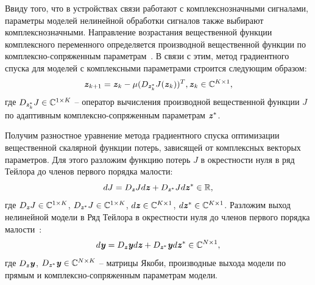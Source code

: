Ввиду того, что в устройствах связи работают с комплекснозначными сигналами, параметры моделей нелинейной обработки сигналов также выбирают комплекснозначными. Направление возрастания вещественной функции комплексного переменного определяется производной вещественной функции по комплексно-сопряженным параметрам~\cite{wirt_deriv_book}. В связи с этим, метод градиентного спуска для моделей с комплексными параметрами строится следующим образом:
\begin{equation}
	\textbf{\textit{z}}_{k+1}=\textbf{\textit{z}}_{k}-\mu (D_{\textbf{\textit{z}}_k^*}J(\textbf{\textit{z}}_{k}))^T, \textbf{\textit{z}}_k\in\mathbb{C}^{K\times1},
	\label{grad_descent_сomplex}
\end{equation}
где $D_{\textbf{\textit{z}}_k^*}J\in\mathbb{C}^{1\times K}$ -- оператор вычисления производной вещественной функции $J$ по адаптивным комплексно-сопряженным параметрам $\textbf{\textit{z}}^*$.

Получим разностное уравнение метода градиентного спуска оптимизации вещественной скалярной функции потерь, зависящей от комплексных векторых параметров. Для этого разложим функцию потерь $J$ в окрестности нуля в ряд Тейлора до членов первого порядка малости:
\begin{equation}
	dJ=D_{\textbf{\textit{z}}}Jd\textbf{\textit{z}}+D_{\textbf{\textit{z}}^*}Jd\textbf{\textit{z}}^*\in\mathbb{R},
	\label{first_diff}
\end{equation}
где $D_{\textbf{\textit{z}}}J\in\mathbb{C}^{1\times K}$, $D_{\textbf{\textit{z}}^*}J\in\mathbb{C}^{1\times K}$, $d\textbf{\textit{z}}\in\mathbb{C}^{K\times 1}$, $d\textbf{\textit{z}}^*\in\mathbb{C}^{K\times 1}$.
Разложим выход нелинейной модели в Ряд Тейлора в окрестности нуля до членов первого порядка малости~\cite{wirt_deriv_book}:
\begin{equation}
	d\textbf{\textit{y}}=D_{\textbf{\textit{z}}}\textbf{\textit{y}}d\textbf{\textit{z}}+D_{\textbf{\textit{z}}^*}\textbf{\textit{y}}d\textbf{\textit{z}}^*\in\mathbb{C}^{N\times 1},
	\label{first_diff_model}
\end{equation}
где $D_{\textbf{\textit{z}}}\textbf{\textit{y}}$, $D_{\textbf{\textit{z}}^*}\textbf{\textit{y}}\in\mathbb{C}^{N\times K}$ -- матрицы Якоби, производные выхода модели по прямым и комплексно-сопряженным параметрам модели.

